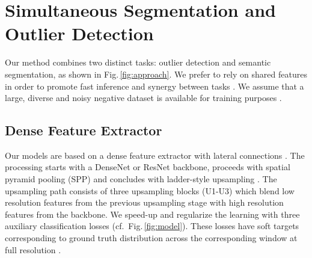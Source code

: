 \documentclass[runningheads]{llncs}
\begin{document}
\begin{comment}
        dataset
        \item \cite{zendel18eccv} introduce WildDash based on previous
        findings, wilddash validation is used as ID during testing
        \item wilddash benchmark contains outlier samples
        \item \cite{shafaei2018} define unbiased outlier detector evaluation -  outlier
        dataset used during training not used for outlier evaluation
    \end{itemize}
    \item improving generalization:
    \begin{itemize}
        \item \cite{kreso17cvrsuad}, \cite{orsic2019cvpr}  show that imagenet pretraining  improves
        generalization
        \item jittering during training, l2-regularization
        \item generalization through model design (complicated models
        prone to overfitting)
    \end{itemize}
\end{itemize}
\end{comment}

\section{Simultaneous Segmentation and Outlier Detection}
\label{ss:model}

Our method combines two distinct tasks:
outlier detection and semantic segmentation,
as shown in Fig.\,\ref{fig:approach}. 
We prefer to rely on shared features 
in order to promote fast inference
and synergy between tasks \cite{bengio13pami}.
We assume that a large, diverse and noisy
negative dataset is available
for training purposes
\cite{hendrycks19iclr,bevandic2018}.

\subsection{Dense Feature Extractor}

Our models are based on  
a dense feature extractor
with lateral connections
\cite{kreso17cvrsuad}.
The processing starts with a 
DenseNet \cite{huang17cvpr} or 
ResNet \cite{He2016DeepRL} backbone, 
proceeds with spatial pyramid pooling (SPP) 
\cite{he14eccv,zhao17cvpr}
and concludes with ladder-style upsampling
\cite{kreso17cvrsuad,lintsungyi17cvpr}.
The upsampling path consists of 
three upsampling blocks (U1-U3)
which blend low resolution features
from the previous upsampling stage
with high resolution features from the backbone.
We speed-up and regularize the learning
with three auxiliary classification losses
(cf.~Fig.\,\ref{fig:model}). 
These losses have soft targets corresponding
to ground truth distribution 
across the corresponding window
at full resolution \cite{kreso19arxiv}.
\end{document}
